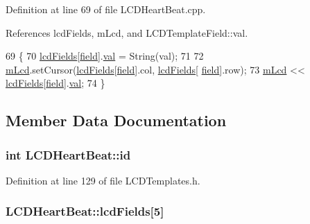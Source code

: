 Definition at line 69 of file L\-C\-D\-Heart\-Beat.\-cpp.



References lcd\-Fields, m\-Lcd, and L\-C\-D\-Template\-Field\-::val.


\begin{DoxyCode}
69                                                    \{
70   \hyperlink{class_l_c_d_heart_beat_a1263743be2d71a8219f8e15eef9f0b33}{lcdFields}[\hyperlink{_l_c_d_templates_8h_a20a49e010fbfc3a43959f12d92e01bb6}{field}].\hyperlink{struct_l_c_d_template_field_a6eb7ce0547fc28ac3a2538f0fac3f117}{val} = String(val);
71 
72   \hyperlink{class_l_c_d_heart_beat_a4ca0c070f107ad510da6d866f1333790}{mLcd}.setCursor(\hyperlink{class_l_c_d_heart_beat_a1263743be2d71a8219f8e15eef9f0b33}{lcdFields}[\hyperlink{struct_l_c_d_template_field}{field}].col, \hyperlink{class_l_c_d_heart_beat_a1263743be2d71a8219f8e15eef9f0b33}{lcdFields}[
      \hyperlink{struct_l_c_d_template_field}{field}].row);
73   \hyperlink{class_l_c_d_heart_beat_a4ca0c070f107ad510da6d866f1333790}{mLcd} << \hyperlink{class_l_c_d_heart_beat_a1263743be2d71a8219f8e15eef9f0b33}{lcdFields}[\hyperlink{_l_c_d_templates_8h_a20a49e010fbfc3a43959f12d92e01bb6}{field}].\hyperlink{struct_l_c_d_template_field_a6eb7ce0547fc28ac3a2538f0fac3f117}{val};
74 \}
\end{DoxyCode}


\subsection{Member Data Documentation}
\hypertarget{class_l_c_d_heart_beat_ab8a6761e9071361d1c9015586707338d}{
\subsubsection[{id}]{\setlength{\rightskip}{0pt plus 5cm}int L\-C\-D\-Heart\-Beat\-::id}}\label{class_l_c_d_heart_beat_ab8a6761e9071361d1c9015586707338d}


Definition at line 129 of file L\-C\-D\-Templates.\-h.

\hypertarget{class_l_c_d_heart_beat_a1263743be2d71a8219f8e15eef9f0b33}{
\subsubsection[{lcd\-Fields}]{ L\-C\-D\-Heart\-Beat\-::lcd\-Fields\mbox{[}5\mbox{]}}}\label{class_l_c_d_heart_beat_a1263743be2d71a8219f8e15eef9f0b33}


